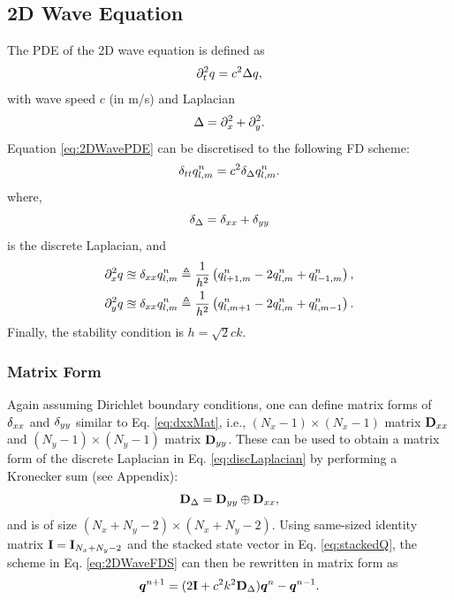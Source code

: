 \documentclass[fleqn]{jaes}
\begin{document}
\subsection{2D Wave Equation}
The PDE of the 2D wave equation is defined as
\begin{equation}\label{eq:2DWavePDE}
    \ptt q = c^2 \Delta q,
\end{equation}
with wave speed $c$ (in m/s) and Laplacian
\begin{equation}
    \Delta = \partial_x^2 + \partial_y^2.
\end{equation}
Equation \eqref{eq:2DWavePDE} can be discretised to the following FD scheme:
\begin{equation}\label{eq:2DWaveFDS}
    \dtt \qlmn = c^2 \dDelta \qlmn.
\end{equation}
where,
\begin{equation}\label{eq:discLaplacian}
    \dDelta = \dxx + \dyy
\end{equation}
is the discrete Laplacian, and 
\begin{subequations}
\begin{align}
    \partial_x^2 q &\approxeq \delta_{xx} q_{l,m}^n \triangleq \frac{1}{h^2}\left(q_{l+1,m}^n - 2 q_{l,m}^n + q_{l-1,m}^n\right),\\
    \partial_y^2 q &\approxeq \delta_{xx} q_{l,m}^n \triangleq \frac{1}{h^2}\left(q_{l,m+1}^n - 2 q_{l,m}^n + q_{l,m-1}^n\right).
\end{align}
\end{subequations}
Finally, the stability condition is $h = \sqrt{2}c k$.

\subsubsection{Matrix Form}
Again assuming Dirichlet boundary conditions, one can define matrix forms of $\delta_{xx}$ and $\delta_{yy}$ similar to Eq. \eqref{eq:dxxMat}, i.e., $(N_x-1)\times(N_x-1)$ matrix $\mathbf{D}_{xx}$ and $(N_y-1)\times(N_y-1)$ matrix $\mathbf{D}_{yy}$. These can be used to obtain a matrix form of the discrete Laplacian in Eq. \eqref{eq:discLaplacian} by performing a Kronecker sum \cite{Horn1991} (see Appendix):
\begin{equation}\label{eq:kroneckerSum}
    \DDeltamat = \Dyy \oplus \Dxx,
\end{equation}
and is of size $(N_x+N_y-2)\times (N_x+N_y-2)$.
%
Using same-sized identity matrix $\mathbf{I} = \mathbf{I}_{N_x+N_y-2}$ and the stacked state vector in Eq. \eqref{eq:stackedQ}, the scheme in Eq. \eqref{eq:2DWaveFDS} can then be rewritten in matrix form as
\begin{equation}
    \boldsymbol{q}^{n+1} = (2\mathbf{I} + c^2 k^2\mathbf{D}_\Delta)\boldsymbol{q}^n - \boldsymbol{q}^{n-1}.
\end{equation}
\end{document}
